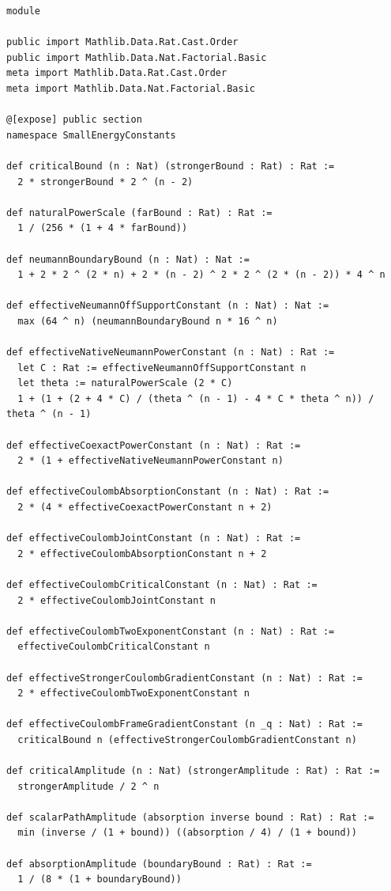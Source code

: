 \documentclass[reqno,11pt]{amsart}
\numberwithin{equation}{section}
\theoremstyle{definition}
\theoremstyle{remark}
\begin{document}
\begin{lstlisting}
module

public import Mathlib.Data.Rat.Cast.Order
public import Mathlib.Data.Nat.Factorial.Basic
meta import Mathlib.Data.Rat.Cast.Order
meta import Mathlib.Data.Nat.Factorial.Basic

@[expose] public section
namespace SmallEnergyConstants

def criticalBound (n : Nat) (strongerBound : Rat) : Rat :=
  2 * strongerBound * 2 ^ (n - 2)

def naturalPowerScale (farBound : Rat) : Rat :=
  1 / (256 * (1 + 4 * farBound))

def neumannBoundaryBound (n : Nat) : Nat :=
  1 + 2 * 2 ^ (2 * n) + 2 * (n - 2) ^ 2 * 2 ^ (2 * (n - 2)) * 4 ^ n

def effectiveNeumannOffSupportConstant (n : Nat) : Nat :=
  max (64 ^ n) (neumannBoundaryBound n * 16 ^ n)

def effectiveNativeNeumannPowerConstant (n : Nat) : Rat :=
  let C : Rat := effectiveNeumannOffSupportConstant n
  let theta := naturalPowerScale (2 * C)
  1 + (1 + (2 + 4 * C) / (theta ^ (n - 1) - 4 * C * theta ^ n)) / theta ^ (n - 1)

def effectiveCoexactPowerConstant (n : Nat) : Rat :=
  2 * (1 + effectiveNativeNeumannPowerConstant n)

def effectiveCoulombAbsorptionConstant (n : Nat) : Rat :=
  2 * (4 * effectiveCoexactPowerConstant n + 2)

def effectiveCoulombJointConstant (n : Nat) : Rat :=
  2 * effectiveCoulombAbsorptionConstant n + 2

def effectiveCoulombCriticalConstant (n : Nat) : Rat :=
  2 * effectiveCoulombJointConstant n

def effectiveCoulombTwoExponentConstant (n : Nat) : Rat :=
  effectiveCoulombCriticalConstant n

def effectiveStrongerCoulombGradientConstant (n : Nat) : Rat :=
  2 * effectiveCoulombTwoExponentConstant n

def effectiveCoulombFrameGradientConstant (n _q : Nat) : Rat :=
  criticalBound n (effectiveStrongerCoulombGradientConstant n)

def criticalAmplitude (n : Nat) (strongerAmplitude : Rat) : Rat :=
  strongerAmplitude / 2 ^ n

def scalarPathAmplitude (absorption inverse bound : Rat) : Rat :=
  min (inverse / (1 + bound)) ((absorption / 4) / (1 + bound))

def absorptionAmplitude (boundaryBound : Rat) : Rat :=
  1 / (8 * (1 + boundaryBound))


\end{lstlisting}
\end{document}
